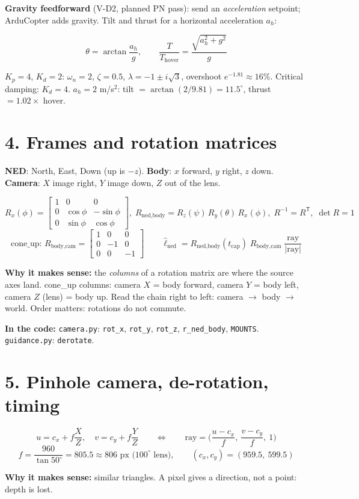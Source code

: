 \documentclass[10pt]{article}
\newcommand{\code}[1]{\textcolor{code}{\texttt{#1}}}
\newcommand{\where}[1]{\par\textbf{\textcolor{code}{In the code:}} #1}
\newcommand{\why}[1]{\par\textbf{\textcolor{idea}{Why it makes sense:}} #1}
\begin{document}
\textbf{Gravity feedforward} (V-D2, planned PN pass): send an \emph{acceleration}
setpoint; ArduCopter adds gravity. Tilt and thrust for a horizontal acceleration $a_h$:
\begin{eqbox}
\[
\theta = \arctan\frac{a_h}{g},\qquad \frac{T}{T_\text{hover}} = \frac{\sqrt{a_h^2 + g^2}}{g}
\]
\end{eqbox}
\begin{exbox}
$K_p = 4$, $K_d = 2$: $\omega_n = 2$, $\zeta = 0.5$, $\lambda = -1 \pm i\sqrt3$, overshoot
$e^{-1.81} \approx 16\%$. Critical damping: $K_d = 4$.
$a_h = 2$ m/s$^2$: tilt $= \arctan(2/9.81) = 11.5^\circ$, thrust $= 1.02\times$ hover.
\end{exbox}

\section*{4. Frames and rotation matrices}
\textbf{NED}: North, East, Down (up is $-z$). \textbf{Body}: $x$ forward, $y$ right, $z$
down. \textbf{Camera}: $X$ image right, $Y$ image down, $Z$ out of the lens.
\begin{eqbox}
\[
R_x(\phi)=\begin{bmatrix}1&0&0\\0&\cos\phi&-\sin\phi\\0&\sin\phi&\cos\phi\end{bmatrix},\;
R_\text{ned,body} = R_z(\psi)\,R_y(\theta)\,R_x(\phi),\;
R^{-1} = R^{\mathsf T},\; \det R = 1
\]
\[
\text{cone\_up: } R_\text{body,cam} = \begin{bmatrix}1&0&0\\0&-1&0\\0&0&-1\end{bmatrix}
\qquad
\hat\ell_\text{ned} = R_\text{ned,body}(t_\text{cap})\; R_\text{body,cam}\; \frac{\text{ray}}{|\text{ray}|}
\]
\end{eqbox}
\why{the \emph{columns} of a rotation matrix are where the source axes land. cone\_up
columns: camera $X$ = body forward, camera $Y$ = body left, camera $Z$ (lens) = body up.
Read the chain right to left: camera $\to$ body $\to$ world. Order matters: rotations do
not commute.}
\where{\code{camera.py}: \code{rot\_x}, \code{rot\_y}, \code{rot\_z}, \code{r\_ned\_body},
\code{MOUNTS}. \code{guidance.py}: \code{derotate}.}

\section*{5. Pinhole camera, de-rotation, timing}
\begin{eqbox}
\[
u = c_x + f\frac{X}{Z},\quad v = c_y + f\frac{Y}{Z}
\qquad\Longleftrightarrow\qquad
\text{ray} = \Big(\frac{u-c_x}{f},\ \frac{v-c_y}{f},\ 1\Big)
\]
\[
f = \frac{960}{\tan 50^\circ} = 805.5 \approx 806 \text{ px (100}^\circ\text{ lens)},\qquad
(c_x, c_y) = (959.5,\ 599.5)
\]
\end{eqbox}
\why{similar triangles. A pixel gives a direction, not a point: depth is lost.}
\end{document}
